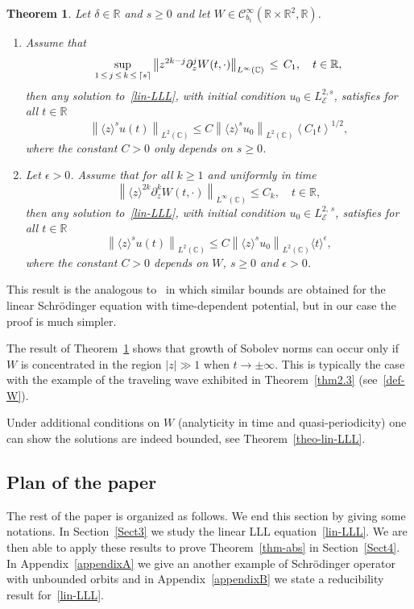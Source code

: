 \documentclass[10pt]{amsart}
\newtheorem{theo}{Theorem}[section]
\theoremstyle{definition}\newtheorem{defi}[theo]{Definition}\newtheorem{rema}[theo]{Remark}\newtheorem{exam}[theo]{Example}\newtheorem{exem}[theo]{Example}\newtheorem{nota}[theo]{Notation}
\DeclarePairedDelimiter\ceil{\lceil}{\rceil}
\newcommand{\C}{\mathbb{C}}
\newcommand{\R}{\mathbb{R}}
\newcommand{\E}{\mathcal{E}}
\newcommand{\clC}{\mathcal{C}}
\newcommand*\eps{\epsilon}
\newcommand{\<}{\langle}
\renewcommand{\>}{\rangle}
\newcommand*{\romanenumi}{\renewcommand*{\theenumi}{\roman{enumi}}}
\begin{document}
\begin{theo} \label{thm2.4}
Let $\delta \in \R$ and $s\geq 0$ and let $W \in \clC^{\infty}_{b_t}(\R\times \R^2, \R)$.
\begin{enumerate}\romanenumi
\item\label{theo2.4.1} Assume that
\[
\sup_{1\,\leq\,j\,\leq\,k\,\leq\,\ceil[]s}\left\|z^{2k-j}\partial^j_z W(t,\cdot)\right\|_{L^{\infty}(\C)}\,\leq\,C_{1},\quad t\in \R,
\]
then any solution to~\eqref{lin-LLL}, with initial condition $u_0 \in L^{2,s}_\E$, satisfies for all $t\in \R$
\[
\left\|\<z\>^s u(t)\right\|_{L^{2}(\C)} \leq C\left\|\<z\>^s u_0\right\|_{L^{2}(\C)} \left\< C_1 t\right\>^{1/2},
\]
where the constant $C>0$ only depends on $s\ge 0$.
\item\label{theo2.4.2} Let $\eps>0$. Assume that for all $k \geq 1 $ and uniformly in time
\begin{equation}\label{condi-W2}
\left\|\<z\>^{2k}\partial^k_z W(t,\cdot)\right\|_{L^{\infty}(\C)}\leq C_{k}, \quad t\in \R,
\end{equation}
then any solution to~\eqref{lin-LLL}, with initial condition $u_0 \in L^{2,\,s}_\E$, satisfies for all $t\in \R$
\[
\left\|\<z\>^s u(t)\right\|_{L^{2}(\C)} \leq C\left\|\<z\>^s u_0\right\|_{L^{2}(\C)} \< t\>^{\eps},
\]
where the constant $C>0$ depends on $W$, $s\geq 0$ and $\eps>0$.
\end{enumerate}
\end{theo}


This result is the analogous to~\cite{Bou99a, Delort} in which similar bounds are obtained for the linear Schr\"odinger equation with time-dependent potential, but in our case the proof is much simpler.

The result of Theorem~\ref{thm2.4} shows that growth of Sobolev norms can occur only if $W$ is concentrated in the region $|z| \gg 1$ when $t \longrightarrow \pm \infty$. This is typically the case with the example of the traveling wave exhibited in Theorem~\ref{thm2.3} (see~\eqref{def-W}).

Under additional conditions on $W$ (analyticity in time and quasi-periodicity) one can show the solutions are indeed bounded, see Theorem~\ref{theo-lin-LLL}.


\subsection{Plan of the paper}
The rest of the paper is organized as follows. We end this section by giving some notations. In Section~\ref{Sect3} we study the linear LLL equation~\eqref{lin-LLL}. We are then able to apply these results to prove Theorem~\ref{thm-abs} in Section~\ref{Sect4}. In Appendix~\ref{appendixA} we give an another example of Schr\"odinger operator with unbounded orbits and in Appendix~\ref{appendixB} we state a reducibility result for~\eqref{lin-LLL}.
\end{document}
